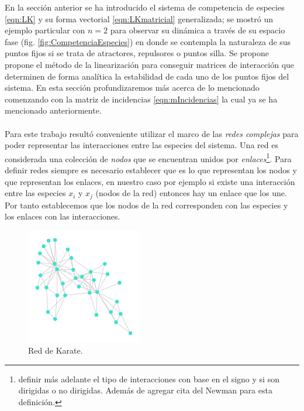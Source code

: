 En la sección anterior se ha introducido el sistema de competencia de especies \ref{eqn:LK} y su forma vectorial \ref{eqn:LKmatricial} generalizada; se mostró un ejemplo particular con $n=2$ para observar su dinámica a través de su espacio fase (fig. \ref{fig:CompetenciaEspecies}) en donde se contempla la naturaleza de sus puntos fijos si se trata de atractores, repulsores o puntos silla. Se propone propone el método de la linearización para conseguir matrices de interacción que determinen de forma analítica la estabilidad de cada uno de los puntos fijos del sistema. En esta sección profundizaremos más acerca de lo mencionado comenzando con la matriz de incidencias \ref{eqn:mIncidencias} la cual ya se ha mencionado anteriormente. \\
\\
Para este trabajo resultó conveniente utilizar el marco de las \textit{redes complejas} para poder representar las interacciones entre las especies del sistema. Una red es considerada una colección de \textit{nodos} que se encuentran unidos por \textit{enlaces}\footnote{definir más adelante el tipo de interacciones con base en el signo y si son dirigidas o no dirigidas. Además de agregar cita del Newman para esta definición.}. Para definir redes siempre es necesario establecer que es lo que representan los nodos y que representan los enlaces, en nuestro caso por ejemplo si existe una interacción entre las especies $x_i$ y $x_j$ (nodos de la red) entonces hay un enlace que los une. Por tanto establecemos que los nodos de la red corresponden con las especies y los enlaces con las interacciones.
\begin{figure} \vspace{-30pt} \begin{center}
		\includegraphics[width=0.45\textwidth]{../Imagenes/karate} 
	\end{center} 
	\vspace{-20pt} 
	\caption{Red de Karate.} 
	\vspace{-10pt}
	\label{fig:RedKarate}
\end{figure} 
